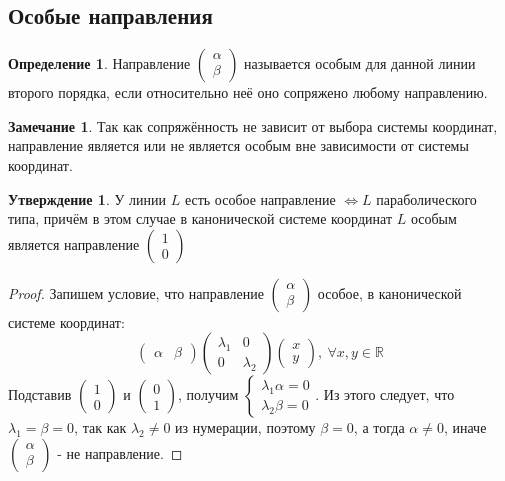 \documentclass[a4paper, 12pt]{article}
\theoremstyle{definition}
\newtheorem*{definition}{Определение}
\newtheorem*{subtheorem}{Утверждение}
\newtheorem*{remark}{Замечание}
\begin{document}
	\subsection{Особые направления}
	\begin{definition}
		Направление $\begin{pmatrix} \alpha \\ \beta \end{pmatrix}$ называется особым для данной линии второго порядка, если относительно неё оно сопряжено любому направлению. 
	\end{definition}
	\begin{remark}
		Так как сопряжённость не зависит от выбора системы координат, направление является или не является особым вне зависимости от системы координат.
	\end{remark}
	\begin{subtheorem}
		У линии $L$ есть особое направление $\Leftrightarrow L$ параболического типа, причём в этом случае в канонической системе координат $L$ особым является направление $\begin{pmatrix} 1 \\ 0 \end{pmatrix}$ 
	\end{subtheorem}
	\begin{proof}
		Запишем условие, что направление $\begin{pmatrix} \alpha \\ \beta \end{pmatrix}$ особое, в канонической системе координат:
		$$\begin{pmatrix} \alpha & \beta \end{pmatrix}\begin{pmatrix} \lambda_1&0 \\ 0&\lambda_2 \end{pmatrix}\begin{pmatrix} x \\ y \end{pmatrix}, \ \forall x, y \in \mathbb{R}$$ 
		Подставив $\begin{pmatrix} 1 \\ 0 \end{pmatrix}$ и $\begin{pmatrix} 0 \\ 1 \end{pmatrix}$, получим $\begin{cases}\lambda_1\alpha = 0\\\lambda_2\beta = 0\end{cases}$. Из этого следует, что $\lambda_1 = \beta = 0$, так как $\lambda_2 \neq 0$ из нумерации, поэтому $\beta = 0$, а тогда $\alpha \neq 0$, иначе $\begin{pmatrix} \alpha \\ \beta \end{pmatrix}$ - не направление.
	\end{proof}
\end{document}
